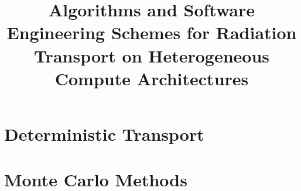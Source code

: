 \documentclass[11pt,onehalf]{general/beavtex}
\title{Algorithms and Software Engineering Schemes for Radiation Transport on Heterogeneous Compute Architectures}
\author{\TheAuthors{}}
\newcommand{\TheAuthors}{Joanna Piper Morgan}
\begin{document}
\maketitle

\mainmatter



\newcommand{\TheTitle}{BLANK}
\renewcommand{\TheAuthors}{BLANK}
\newcommand{\TheAddress}{BLANK}





\part{Deterministic Transport}
\label{part:determ}






\part{Monte Carlo Methods}
\label{part:mc}









\newpage






\appendix

\newpage

\newpage

\end{document}

